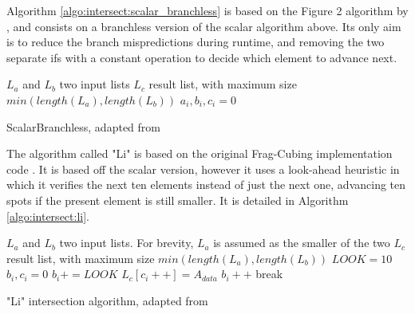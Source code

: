 Algorithm \ref{algo:intersect:scalar_branchless} is based on the Figure 2 algorithm by \cite{inoueFasterSetIntersection2014}, and consists on a branchless version of the scalar algorithm above.
Its only aim is to reduce the branch mispredictions during runtime, and removing the two separate ifs with a constant operation to decide which element to advance next.

\begin{algorithm}[!htb]
\SetAlgoLined
{}
 $L_a$ and $L_b$ two input lists\;
 $L_c$ result list, with maximum size $min(length(L_a), length(L_b))$\;
 $a_i, b_i, c_i = 0$\;
 \;
 \caption{ScalarBranchless, adapted from \cite{inoueFasterSetIntersection2014}}\label{algo:intersect:scalar_branchless}
\end{algorithm}

The algorithm called "Li" is based on the original Frag-Cubing implementation code \cite{liHighdimensionalOLAPMinimal2004}.
It is based off the scalar version, however it uses a look-ahead heuristic in which it verifies the next ten elements instead of just the next one, advancing ten spots if the present element is still smaller.
It is detailed in Algorithm \ref{algo:intersect:li}.

\begin{algorithm}[!htb]
\SetAlgoLined
{}
 $L_a$ and $L_b$ two input lists. For brevity, $L_a$ is assumed as the smaller of the two\;
 $L_c$ result list, with maximum size $min(length(L_a), length(L_b))$\;
 $LOOK = 10$
 $b_i, c_i = 0$\;
 {
   {
     $b_i += LOOK$\;
   }
   {
     $L_c[c_i++] = A_{data}$\;
     $b_i++$\;
   }
   {
     break\;
   }
 }
 \;
 \caption{"Li" intersection algorithm, adapted from \cite{liHighdimensionalOLAPMinimal2004}}\label{algo:intersect:li}
\end{algorithm}


